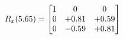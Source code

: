 \documentclass[preview]{standalone}
\begin{document}
\begin{align*}
\special{dvisvgm:raw <g id='unique000'>}R_{x}(5.65) = \begin{bmatrix}1 & 0 & 0 \\0 & +0.81 & +0.59 \\0 & -0.59 & +0.81\end{bmatrix}\special{dvisvgm:raw </g>}
\end{align*}
\end{document}

